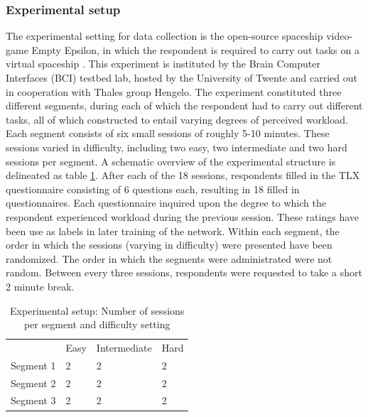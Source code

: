 \documentclass[12pt]{article}
\begin{document}
\subsubsection{Experimental setup}
The experimental setting for data collection is the open-source spaceship video-game Empty Epsilon, in which the respondent is required to carry out tasks on a virtual spaceship \cite{daid2016empty}. This experiment is instituted by the Brain Computer Interfaces (BCI) testbed lab, hosted by the University of Twente and carried out in cooperation with Thales group Hengelo. The experiment constituted three different segments, during each of which the respondent had to carry out different tasks, all of which constructed to entail varying degrees of perceived workload. Each segment consists of six small sessions of roughly 5-10 minutes. These sessions varied in difficulty, including two easy, two intermediate and two hard sessions per segment. A schematic overview of the experimental structure is delineated as table \ref{table:expsetup}. After each of the 18 sessions, respondents filled in the TLX questionnaire consisting of 6 questions each, resulting in 18 filled in questionnaires. Each questionnaire inquired upon the degree to which the respondent experienced workload during the previous session. These ratings have been use as labels in later training of the network. Within each segment, the order in which the sessions (varying in difficulty) were presented have been randomized. The order in which the segments were administrated were not random. Between every three sessions, respondents were requested to take a short 2 minute break.
\bigskip
\bgroup
\def\arraystretch{1.6}%
\begin{table}[h]
\centering
\caption{Experimental setup: Number of sessions per segment and difficulty setting}
\label{table:expsetup}
\begin{tabular}{llll}
                               & Easy                   & Intermediate           & Hard                   \\ \cline{2-4} 
\multicolumn{1}{l|}{Segment 1} & \multicolumn{1}{l|}{2} & \multicolumn{1}{l|}{2} & \multicolumn{1}{l|}{2} \\ \cline{2-4} 
\multicolumn{1}{l|}{Segment 2} & \multicolumn{1}{l|}{2} & \multicolumn{1}{l|}{2} & \multicolumn{1}{l|}{2} \\ \cline{2-4} 
\multicolumn{1}{l|}{Segment 3} & \multicolumn{1}{l|}{2} & \multicolumn{1}{l|}{2} & \multicolumn{1}{l|}{2} \\ \cline{2-4} 
\end{tabular}
\end{table}
\egroup
\bigskip 
\end{document}
